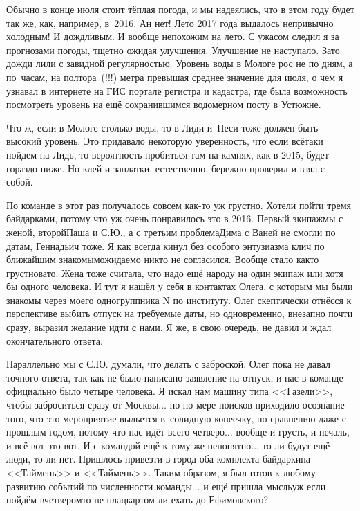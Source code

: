 Обычно в конце июля стоит тёплая погода, и мы надеялись, что в этом году будет так же, как, например, в~2016. Ан нет! Лето 2017 года выдалось непривычно холодным! И дождливым. И вообще непохожим на лето. С ужасом следил я за прогнозами погоды, тщетно ожидая улучшения. Улучшение не наступало. Зато дожди лили с завидной регулярностью. Уровень воды в Мологе рос не по дням, а по~часам, на полтора~(!!!) метра превышая среднее значение для июля, о чем я узнавал в интернете на ГИС портале регистра и кадастра, где была возможность посмотреть уровень на ещё сохранившимся водомерном посту в Устюжне. 

Что ж, если в Мологе столько воды, то в Лиди и~Песи тоже должен быть высокий уровень. Это придавало некоторую уверенность, что если всё\sdash таки пойдем на Лидь, то вероятность пробиться там на камнях, как в 2015, будет гораздо ниже. Но клей и заплатки, естественно, бережно проверил и взял с собой.

По команде в этот раз получалось совсем как-то уж грустно. 
Хотели пойти тремя байдарками, потому что уж очень понравилось это в 2016. Первый экипаж\mdash мы с женой, второй\mdash Паша и С.Ю., а с третьим проблема\mdash Дима с Ваней не смогли по датам, Геннадьич тоже. Я как всегда кинул без особого энтузиазма клич по ближайшим знакомым\mdash ожидаемо никто не согласился. Вообще стало как\sdash то грустновато. Жена тоже считала, что надо ещё народу на один экипаж или хотя бы одного человека. И тут я нашёл у себя в контактах Олега, с которым мы были знакомы через моего одногруппника N по институту. Олег скептически отнёсся к перспективе выбить отпуск на требуемые даты, но одновременно, внезапно почти сразу, выразил желание идти с нами. Я же, в свою очередь, не давил и ждал окончательного ответа. 

Параллельно мы с С.Ю. думали, что делать с заброской. Олег пока не давал точного ответа, так как не было написано заявление на отпуск, и нас в команде официально было четыре человека. Я искал нам машину типа <<Газели>>, чтобы заброситься сразу от Москвы$\ldots$ но по мере поисков приходило осознание того, что это мероприятие выльется в~солидную копеечку, по сравнению даже с прошлым годом, потому что нас идёт всего четверо$\ldots$ вообще и грусть, и печаль, и всё вот это вот. И с командой ещё к тому же непонятно$\ldots$ то ли будут ещё люди, то ли нет. Пришлось привезти в город оба комплекта байдарки\mdash на <<Таймень>> и <<Таймень>>. Таким образом, я был готов к любому развитию событий по численности команды$\ldots$ и ещё пришла мысль\mdash уж если пойдём вчетвером\mdash то не плацкартом ли ехать до Ефимовского?


